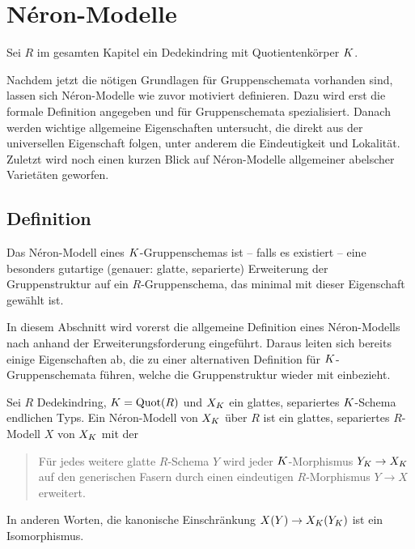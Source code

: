 \chapter{Néron-Modelle}\label{chap:neronmodelle}
Sei $R$ im gesamten Kapitel ein Dedekindring mit Quotientenkörper
$K$.

Nachdem jetzt die nötigen Grundlagen für Gruppenschemata vorhanden
sind, lassen sich Néron-Modelle wie zuvor motiviert definieren.
Dazu wird erst die formale Definition angegeben und für
Gruppenschemata spezialisiert. Danach werden wichtige allgemeine
Eigenschaften untersucht, die direkt aus der universellen Eigenschaft
folgen, unter anderem die Eindeutigkeit und Lokalität.
Zuletzt wird noch einen kurzen Blick auf Néron-Modelle
allgemeiner abelscher Varietäten geworfen.

\section{Definition}
Das Néron-Modell eines $K$-Gruppenschemas ist – falls es existiert –
eine besonders gutartige (genauer: glatte, separierte) Erweiterung der
Gruppenstruktur auf ein $R$-Gruppenschema, das
minimal mit dieser Eigenschaft gewählt ist.

In diesem Abschnitt wird vorerst die allgemeine Definition eines
Néron-Modells nach \cite[Definition~1.2/1]{neron} anhand der
Erweiterungsforderung eingeführt. Daraus leiten sich bereits einige
Eigenschaften ab, die zu einer alternativen Definition für
$K$-Gruppenschemata führen, welche die Gruppenstruktur wieder mit
einbezieht.

\begin{Definition}
  Sei $R$ Dedekindring, $K=\operatorname{Quot}(R)$ und
  $X_{K}$ ein glattes, separiertes $K$-Schema endlichen Typs.
  Ein Néron-Modell von $X_{K}$ über $R$ ist ein glattes, separiertes
  $R$-Modell $X$ von $X_{K}$ mit der \NAbbEig
  \begin{quote}
    Für jedes weitere glatte $R$-Schema $Y$ wird jeder
    $K$-Morphismus $Y_{K}\to X_{K}$ auf den generischen Fasern durch
    einen eindeutigen $R$-Morphismus $Y\to X$ erweitert.
  \end{quote}
  In anderen Worten, die kanonische Einschränkung $X(Y)\to
  X_{K}(Y_{K})$ ist ein Isomorphismus.
\end{Definition}

